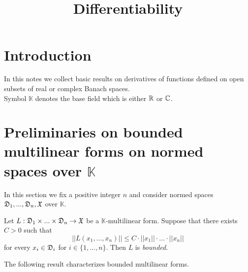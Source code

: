 



\title{Differentiability}
\date{}
\maketitle

\section{Introduction}
\noindent
In this notes we collect basic results on derivatives of functions defined on open subsets of real or complex Banach spaces.\\
Symbol $\mathbb{K}$ denotes the base field which is either ${\mathbb R}$ or ${\mathbb C}$.

\section{Preliminaries on bounded multilinear forms on normed spaces over $\mathbb{K}$}
\noindent
In this section we fix a positive integer $n$ and consider normed spaces ${\mathfrak D}_1,...,{\mathfrak D}_n, {\mathfrak X}$ over $\mathbb{K}$. 

\begin{definition}
Let $L:{\mathfrak D}_1\times ... \times {\mathfrak D}_n\rightarrow {\mathfrak X}$ be a $\mathbb{K}$-multilinear form. Suppose that there exists $C > 0$ such that
$$||L(x_1,...,x_n)|| \leq C\cdot ||x_1||\cdot ... \cdot ||x_n||$$
for every $x_i \in {\mathfrak D}_i$ for $i\in \{1,...,n\}$. Then $L$ is \textit{bounded}.
\end{definition}
\noindent
The following result characterizes bounded multilinear forms.

